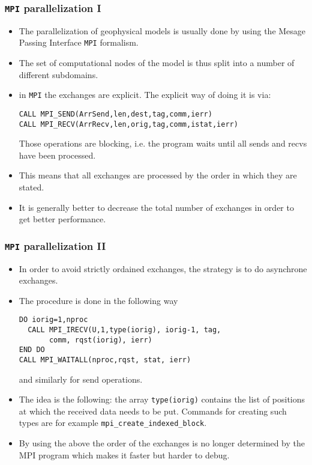 \documentclass{beamer}
\begin{document}
\begin{frame}[fragile]
  \frametitle{{\tt MPI} parallelization I}
\begin{itemize}
\item The parallelization of geophysical models is usually done by using the Mesage Passing Interface {\tt MPI} formalism.
\item The set of computational nodes of the model is thus split into a number of different subdomains.
\item in {\tt MPI} the exchanges are explicit. The explicit way of doing it is via:
\begin{verbatim}
CALL MPI_SEND(ArrSend,len,dest,tag,comm,ierr)
CALL MPI_RECV(ArrRecv,len,orig,tag,comm,istat,ierr)
\end{verbatim}
Those operations are blocking, i.e. the program waits until all sends and recvs have been processed.
\item This means that all exchanges are processed by the order in which they are stated.
\item It is generally better to decrease the total number of exchanges in order to get better performance.
\end{itemize}
\end{frame}


\begin{frame}[fragile]
  \frametitle{{\tt MPI} parallelization II}
\begin{itemize}
\item In order to avoid strictly ordained exchanges, the strategy is to do asynchrone exchanges.
\item The procedure is done in the following way
\begin{verbatim}
DO iorig=1,nproc
  CALL MPI_IRECV(U,1,type(iorig), iorig-1, tag, 
       comm, rqst(iorig), ierr)
END DO
CALL MPI_WAITALL(nproc,rqst, stat, ierr)
\end{verbatim}
and similarly for send operations.
\item The idea is the following: the array {\tt type(iorig)} contains the list of positions at which the received data needs to be put. Commands for creating such types are for example {\tt mpi\_create\_indexed\_block}.
\item By using the above the order of the exchanges is no longer determined by the MPI program which makes it faster but harder to debug.
\end{itemize}
\end{frame}


\end{document}
